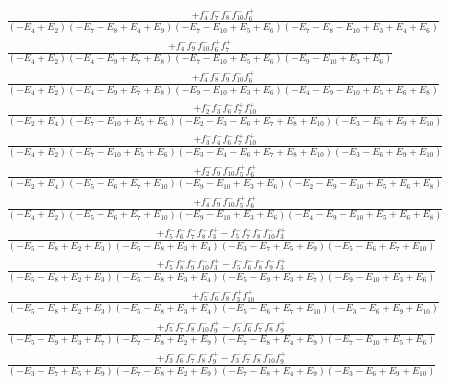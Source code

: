 \documentclass{article}
\begin{document}
\[\begin{array}{rcl}
\frac{+f_{4}^{-}f_{7}^{-}f_{8}^{-}f_{10}^{-}f_{6}^{+}}{(-E_{4}+E_{2})(-E_{7}-E_{8}+E_{4}+E_{9})(-E_{7}-E_{10}+E_{5}+E_{6})(-E_{7}-E_{8}-E_{10}+E_{3}+E_{4}+E_{6})}\\
\frac{+f_{4}^{-}f_{9}^{-}f_{10}^{-}f_{6}^{+}f_{7}^{+}}{(-E_{4}+E_{2})(-E_{4}-E_{9}+E_{7}+E_{8})(-E_{7}-E_{10}+E_{5}+E_{6})(-E_{9}-E_{10}+E_{3}+E_{6})}\\
\frac{+f_{4}^{-}f_{8}^{-}f_{9}^{-}f_{10}^{-}f_{6}^{+}}{(-E_{4}+E_{2})(-E_{4}-E_{9}+E_{7}+E_{8})(-E_{9}-E_{10}+E_{3}+E_{6})(-E_{4}-E_{9}-E_{10}+E_{5}+E_{6}+E_{8})}\\
\frac{+f_{2}^{-}f_{3}^{-}f_{6}^{-}f_{7}^{+}f_{10}^{+}}{(-E_{2}+E_{4})(-E_{7}-E_{10}+E_{5}+E_{6})(-E_{2}-E_{3}-E_{6}+E_{7}+E_{8}+E_{10})(-E_{3}-E_{6}+E_{9}+E_{10})}\\
\frac{+f_{3}^{-}f_{4}^{-}f_{6}^{-}f_{7}^{+}f_{10}^{+}}{(-E_{4}+E_{2})(-E_{7}-E_{10}+E_{5}+E_{6})(-E_{3}-E_{4}-E_{6}+E_{7}+E_{8}+E_{10})(-E_{3}-E_{6}+E_{9}+E_{10})}\\
\frac{+f_{2}^{-}f_{9}^{-}f_{10}^{-}f_{5}^{+}f_{6}^{+}}{(-E_{2}+E_{4})(-E_{5}-E_{6}+E_{7}+E_{10})(-E_{9}-E_{10}+E_{3}+E_{6})(-E_{2}-E_{9}-E_{10}+E_{5}+E_{6}+E_{8})}\\
\frac{+f_{4}^{-}f_{9}^{-}f_{10}^{-}f_{5}^{+}f_{6}^{+}}{(-E_{4}+E_{2})(-E_{5}-E_{6}+E_{7}+E_{10})(-E_{9}-E_{10}+E_{3}+E_{6})(-E_{4}-E_{9}-E_{10}+E_{5}+E_{6}+E_{8})}\\
\frac{+f_{5}^{-}f_{6}^{-}f_{7}^{-}f_{8}^{-}f_{3}^{+}-f_{5}^{-}f_{7}^{-}f_{8}^{-}f_{10}^{-}f_{3}^{+}}{(-E_{5}-E_{8}+E_{2}+E_{3})(-E_{5}-E_{8}+E_{3}+E_{4})(-E_{3}-E_{7}+E_{5}+E_{9})(-E_{5}-E_{6}+E_{7}+E_{10})}\\
\frac{+f_{5}^{-}f_{8}^{-}f_{9}^{-}f_{10}^{-}f_{3}^{+}-f_{5}^{-}f_{6}^{-}f_{8}^{-}f_{9}^{-}f_{3}^{+}}{(-E_{5}-E_{8}+E_{2}+E_{3})(-E_{5}-E_{8}+E_{3}+E_{4})(-E_{5}-E_{9}+E_{3}+E_{7})(-E_{9}-E_{10}+E_{3}+E_{6})}\\
\frac{+f_{5}^{-}f_{6}^{-}f_{8}^{-}f_{3}^{+}f_{10}^{+}}{(-E_{5}-E_{8}+E_{2}+E_{3})(-E_{5}-E_{8}+E_{3}+E_{4})(-E_{5}-E_{6}+E_{7}+E_{10})(-E_{3}-E_{6}+E_{9}+E_{10})}\\
\frac{+f_{5}^{-}f_{7}^{-}f_{8}^{-}f_{10}^{-}f_{9}^{+}-f_{5}^{-}f_{6}^{-}f_{7}^{-}f_{8}^{-}f_{9}^{+}}{(-E_{5}-E_{9}+E_{3}+E_{7})(-E_{7}-E_{8}+E_{2}+E_{9})(-E_{7}-E_{8}+E_{4}+E_{9})(-E_{7}-E_{10}+E_{5}+E_{6})}\\
\frac{+f_{3}^{-}f_{6}^{-}f_{7}^{-}f_{8}^{-}f_{9}^{+}-f_{3}^{-}f_{7}^{-}f_{8}^{-}f_{10}^{-}f_{9}^{+}}{(-E_{3}-E_{7}+E_{5}+E_{9})(-E_{7}-E_{8}+E_{2}+E_{9})(-E_{7}-E_{8}+E_{4}+E_{9})(-E_{3}-E_{6}+E_{9}+E_{10})}\\

\end{array}\]
\end{document}
